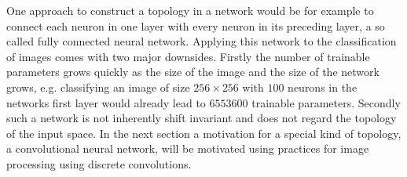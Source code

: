 
One approach to construct a topology in a network would be for example to connect each neuron in one layer with every neuron in its preceding layer, a so called fully connected neural network. Applying this network to the classification of images comes with two major downsides. Firstly the number of trainable parameters grows quickly as the size of the image and the size of the network grows, e.g. classifying an image of size $256\times 256$ with $100$ neurons in the networks first layer would already lead to $6553600$ trainable parameters. Secondly such a network is not inherently shift invariant and does not regard the topology of the input space. In the next section a motivation for a special kind of topology, a convolutional neural network, will be motivated using practices for image processing using discrete convolutions.

